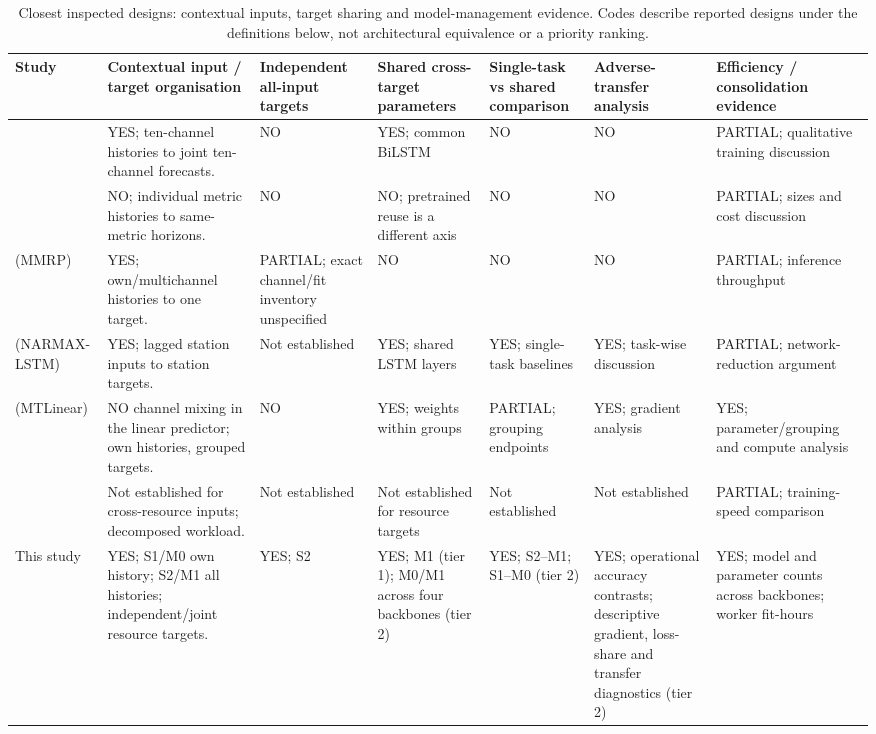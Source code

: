 \documentclass[5p,twocolumn]{elsarticle}
\begin{document}
\begin{table}[t]
  \caption{Closest inspected designs: contextual inputs, target sharing and
  model-management evidence. Codes describe reported designs under the
  definitions below, not architectural equivalence or a priority ranking.}
  \label{tab:related-work-comparison}
  \centering
  \small
  \setlength{\tabcolsep}{3pt}
  \begin{tabular}{@{}
    >{\raggedright\arraybackslash}p{}
    >{\raggedright\arraybackslash}p{}
    *{2}{>{\raggedright\arraybackslash}p{}}
    *{2}{>{\raggedright\arraybackslash}p{}}
    >{\raggedright\arraybackslash}p{}@{}}
    \toprule
    Study & Contextual input / target organisation
      & Independent all-input targets & Shared cross-target parameters
      & Single-task vs shared comparison & Adverse-transfer analysis
      & Efficiency / consolidation evidence \\
    \midrule
    \citet{Ullah2023CloudBiLSTM}
      & YES; ten-channel histories to joint ten-channel forecasts.
      & NO & YES; common BiLSTM & NO & NO
      & PARTIAL; qualitative training discussion \\
    \addlinespace
    \citet{DiMenna2026RuntimeForecasting}
      & NO; individual metric histories to same-metric horizons.
      & NO & NO; pretrained reuse is a different axis & NO & NO
      & PARTIAL; sizes and cost discussion \\
    \addlinespace
    \citet{Tripathi2025MMRP} (MMRP)
      & YES; own/multichannel histories to one target.
      & PARTIAL; exact channel/fit inventory unspecified
      & NO & NO & NO
      & PARTIAL; inference throughput \\
    \addlinespace
    \citet{Nikentari2022NARMAXLSTM} (NARMAX-LSTM)
      & YES; lagged station inputs to station targets.
      & Not established & YES; shared LSTM layers
      & YES; single-task baselines & YES; task-wise discussion
      & PARTIAL; network-reduction argument \\
    \addlinespace
    \citet{Nochumsohn2025MTLinear} (MTLinear)
      & NO channel mixing in the linear predictor; own histories, grouped targets.
      & NO & YES; weights within groups
      & PARTIAL; grouping endpoints & YES; gradient analysis
      & YES; parameter/grouping and compute analysis \\
    \addlinespace
    \citet{Bi2019CloudMultitask}
      & Not established for cross-resource inputs; decomposed workload.
      & Not established & Not established for resource targets
      & Not established & Not established
      & PARTIAL; training-speed comparison \\
    \addlinespace
    This study
      & YES; S1/M0 own history; S2/M1 all histories; independent/joint resource targets.
      & YES; S2 & YES; M1 (tier 1); M0/M1 across four backbones (tier 2)
      & YES; S2--M1; S1--M0 (tier 2)
      & YES; operational accuracy contrasts; descriptive gradient, loss-share and transfer diagnostics (tier 2)
      & YES; model and parameter counts across backbones; worker fit-hours \\
    \bottomrule
  \end{tabular}


\end{table}
\end{document}
